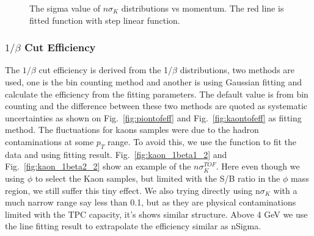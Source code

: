 \begin{figure}[htbp]
\begin{minipage}[htbp]{0.5\linewidth}
\caption{The sigma value of $n\sigma_{K}$ distributions vs momentum. The red line is fitted function with step linear function. \label{fig:kaonsigma}}
\end{minipage}
\end{figure}

\subsubsection{$1/\beta$ Cut Efficiency}
The $1/\beta$ cut efficiency is derived from the 1/$\beta$ distributions, two methods are used, one is the bin counting method and another is using Gaussian fitting and calculate the efficiency from the fitting parameters. The default value is from bin counting and the difference between these two methods are quoted as systematic uncertainties as shown on Fig.~\ref{fig:piontofeff} and Fig.~\ref{fig:kaontofeff} as fitting method. The fluctuations for kaons samples were due to the hadron contaminations at some $p_T$ range. To avoid this, we use the function to fit the data and using fitting result. Fig.~\ref{fig:kaon_1beta1_2} and Fig.~\ref{fig:kaon_1beta2_2} show an example of the $n\sigma_{K}^{TOF}$. Here even though we using $\phi$ to select the Kaon samples, but limited with the S/B ratio in the $\phi$ mass region, we still suffer this tiny effect. We also trying directly using n$\sigma_{K}$ with a much narrow range say less than 0.1, but as they are physical contaminations limited with the TPC capacity, it's shows similar structure. Above 4 GeV we use the line fitting result to extrapolate the efficiency similar as nSigma.


